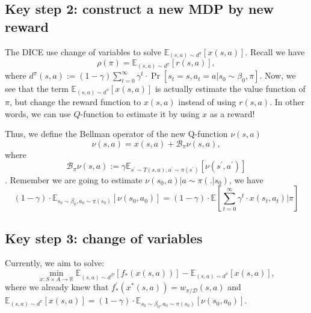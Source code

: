 \documentclass[a4paper]{article}
\theoremstyle{definition}
\begin{document}
\subsection{Key step 2: construct a new MDP by new reward}
The DICE use change of variables to solve $\mathbb{E}_{(s, a) \sim d^{\pi}}[x(s, a)]$.
Recall we have
\begin{equation}
\rho(\pi)=\mathbb{E}_{(s, a) \sim d^{\pi}}[r(s, a)],
\end{equation}
where $
d^{\pi}(s, a):=(1-\gamma) \sum_{t=0}^{\infty} \gamma^{t} \cdot \operatorname{Pr}\left[s_{t}=s, a_{t}=a | s_{0} \sim \beta_{0}, \pi\right]
$.
Now, we see that the term $\mathbb{E}_{(s, a) \sim d^{\pi}}[x(s, a)]$ is actually {\color{red}estimate the value function of $\pi$, but change the reward function to $x(s,a)$ instead of using $r(s,a)$}. In other words, we can use $Q$-function to estimate it by using $x$ as a reward!

Thus, we define the Bellman operator of the new Q-function $\nu(s, a)$
\begin{equation}
\nu(s, a)=x(s, a)+\mathcal{B}_{\pi} \nu(s, a),
\end{equation}
where \begin{equation}
\mathcal{B}_{\pi} \nu(s, a):=\gamma \mathbb{E}_{s^{\prime} \sim T(s, a), a^{\prime} \sim \pi\left(s^{\prime}\right)}\left[\nu\left(s^{\prime}, a^{\prime}\right)\right]
\end{equation}.
Remember we are going to estimate $\nu(s_0, a)|a \sim \pi(.|s_0)$, we have
\begin{equation}
(1-\gamma) \cdot \mathbb{E}_{s_{0} \sim \beta_{0}, a_{0} \sim \pi\left(s_{0}\right)}\left[\nu\left(s_{0}, a_{0}\right)\right]=(1-\gamma) \cdot \mathbb{E}\left[\sum_{t=0}^{\infty} \gamma^{t} \cdot x\left(s_{t}, a_{t}\right) | \pi\right]
\end{equation}

\subsection{Key step 3: change of variables}
Currently, we aim to solve:
\begin{equation}
\min _{x: S \times A \rightarrow \mathbb{R}} \mathbb{E}_{(s, a) \sim d^{\mathcal{D}}}\left[f_{*}(x(s, a))\right]-\mathbb{E}_{(s, a) \sim d^{\pi}}[x(s, a)],
\end{equation}
where we already knew that $
f_{*}^{\prime}\left(x^{*}(s, a)\right)=w_{\pi / \mathcal{D}}(s, a)
$ and $\mathbb{E}_{(s, a) \sim d^{\pi}}[x(s, a)] = (1-\gamma) \cdot \mathbb{E}_{s_{0} \sim \beta_{0}, a_{0} \sim \pi\left(s_{0}\right)}\left[\nu\left(s_{0}, a_{0}\right)\right]$.
\end{document}
